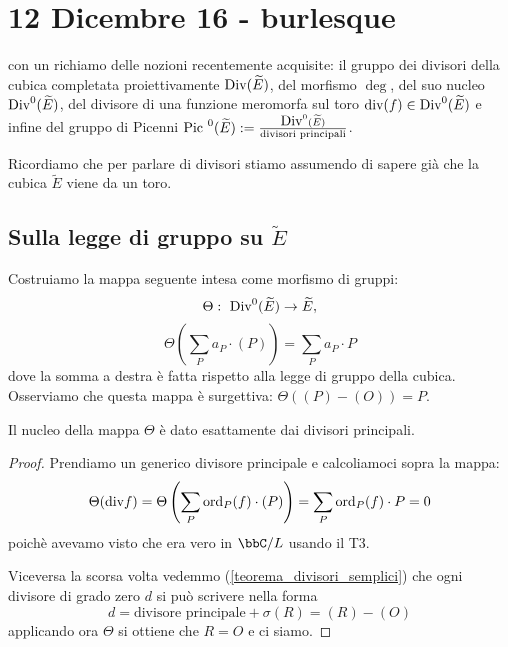 \chapter{12 Dicembre 16 - burlesque}
\justify

 con un richiamo delle nozioni recentemente acquisite: il gruppo dei divisori della cubica completata proiettivamente $\mbox{Div}(\widetilde{E})$, del morfismo $\deg$, del suo nucleo $\mbox{Div}^0(\widetilde{E})$, del divisore di una funzione meromorfa sul toro $\mbox{div}(f)\in\mbox{Div}^0(\widetilde{E})$ e infine del gruppo di Picenni $\mbox{Pic }^0(\widetilde{E}) := \frac{\mbox{Div}^0(\widetilde{E})}{\text{divisori principali}}$.

Ricordiamo che per parlare di divisori stiamo assumendo di sapere già che la cubica $\widetilde{E}$ viene da un toro.

\section{Sulla legge di gruppo su $\widetilde{E}$}
Costruiamo la mappa seguente intesa come morfismo di gruppi:
$$
\Theta: \ \mbox{Div}^0(\widetilde{E})\rightarrow \widetilde{E},
$$
$$
\Theta\left(\sum_P a_P \cdot (P)\right)=\sum_P a_P \cdot P
$$
dove la somma a destra è fatta rispetto alla legge di gruppo della cubica.
Osserviamo che questa mappa è surgettiva: $\Theta((P)-(O))=P$.


\begin{lemma}
Il nucleo della mappa $\Theta$ è dato esattamente dai divisori principali.
\end{lemma}
\begin{proof}
Prendiamo un generico divisore principale e calcoliamoci sopra la mappa:
$$
\Theta(\mbox{div} f)=\Theta\left(\sum_P \text{ord}_P(f) \cdot (P)\right)=\sum_P \text{ord}_P(f)\cdot P=0
$$
poichè avevamo visto che era vero in $\bbC/L$ usando il T3.

Viceversa la scorsa volta vedemmo (\ref{teorema_divisori_semplici}) che ogni divisore di grado zero $d$ si può scrivere nella forma
$$ d = \mbox{divisore principale} + \sigma(R) = (R) - (O) $$
applicando ora $\Theta$ si ottiene che $R=O$ e ci siamo.
\end{proof}


